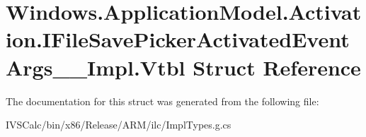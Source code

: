 \hypertarget{struct_windows_1_1_application_model_1_1_activation_1_1_i_file_save_picker_activated_event_args_____impl_1_1_vtbl}{}\section{Windows.\+Application\+Model.\+Activation.\+I\+File\+Save\+Picker\+Activated\+Event\+Args\+\_\+\+\_\+\+Impl.\+Vtbl Struct Reference}
\label{struct_windows_1_1_application_model_1_1_activation_1_1_i_file_save_picker_activated_event_args_____impl_1_1_vtbl}


The documentation for this struct was generated from the following file\+:\begin{DoxyCompactItemize}
\item 
I\+V\+S\+Calc/bin/x86/\+Release/\+A\+R\+M/ilc/Impl\+Types.\+g.\+cs\end{DoxyCompactItemize}
